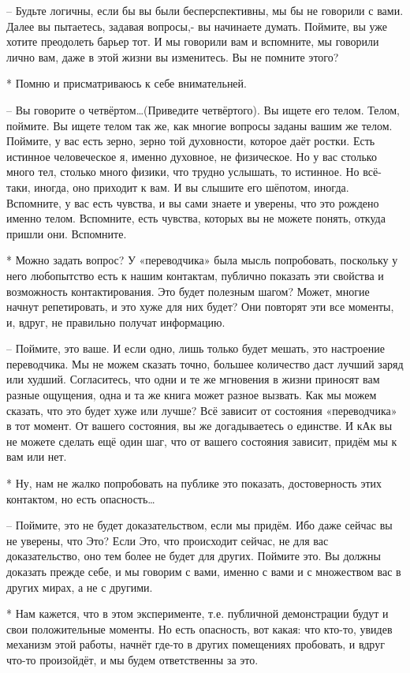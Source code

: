  – Будьте логичны, если бы вы были бесперспективны, мы бы не говорили с вами. Далее вы пытаетесь, задавая вопросы,-  вы начинаете думать. Поймите, вы уже хотите преодолеть барьер тот. И мы говорили вам и вспомните, мы говорили лично вам, даже в этой жизни вы изменитесь. Вы не помните этого?

 * Помню и присматриваюсь к себе внимательней.

 – Вы говорите о четвёртом…(Приведите четвёртого). Вы ищете его телом. Телом, поймите. Вы ищете телом так же, как многие вопросы заданы вашим же телом. Поймите, у вас есть зерно, зерно той духовности, которое даёт ростки. Есть истинное человеческое я, именно духовное, не физическое. Но у вас столько много тел, столько много физики, что трудно услышать, то истинное. Но всё-таки, иногда, оно приходит к вам. И вы слышите его шёпотом, иногда. Вспомните, у вас есть чувства, и вы сами знаете и уверены, что это рождено именно телом. Вспомните, есть чувства, которых вы не можете понять, откуда пришли они. Вспомните.

 * Можно задать вопрос? У «переводчика» была мысль попробовать, поскольку у него любопытство есть к нашим контактам, публично показать эти свойства и возможность контактирования. Это будет полезным шагом? Может, многие начнут репетировать, и это хуже для них будет? Они повторят эти все моменты, и, вдруг, не правильно получат информацию.

 – Поймите, это ваше. И если одно, лишь только будет мешать, это настроение переводчика. Мы не можем сказать точно, большее количество даст лучший заряд или худший. Согласитесь, что одни и те же мгновения в жизни приносят вам разные ощущения, одна и та же книга может разное вызвать. Как мы можем сказать, что это будет хуже или лучше? Всё зависит от состояния «переводчика» в тот момент. От вашего состояния, вы же догадываетесь о единстве. И кАк вы не можете сделать ещё один шаг, что от вашего состояния зависит, придём мы к вам или нет.

 * Ну, нам не жалко попробовать на публике это показать, достоверность этих контактом, но есть опасность…

 – Поймите, это не будет доказательством, если мы придём. Ибо даже сейчас вы не уверены, что Это? Если Это, что происходит сейчас, не для вас доказательство, оно тем более не будет для других. Поймите это. Вы должны доказать прежде себе, и мы говорим с вами, именно с вами и с множеством вас в других мирах, а не с другими.

 * Нам кажется, что в этом эксперименте, т.е. публичной демонстрации будут и свои положительные моменты. Но есть опасность, вот какая: что кто-то, увидев механизм этой работы, начнёт где-то в других помещениях пробовать, и вдруг что-то произойдёт, и мы будем ответственны за это.

